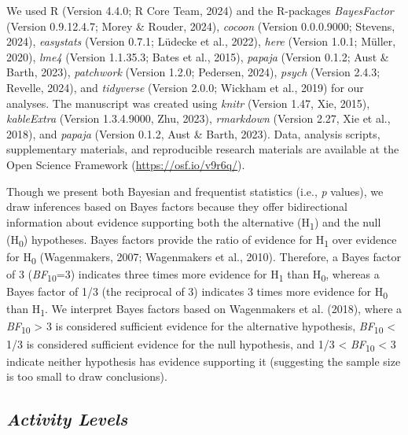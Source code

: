 \documentclass[
  pub]{apa6}
\begin{document}
We used R (Version 4.4.0; R Core Team, 2024) and the R-packages \emph{BayesFactor} (Version 0.9.12.4.7; Morey \& Rouder, 2024), \emph{cocoon} (Version 0.0.0.9000; Stevens, 2024), \emph{easystats} (Version 0.7.1; Lüdecke et al., 2022), \emph{here} (Version 1.0.1; Müller, 2020), \emph{lme4} (Version 1.1.35.3; Bates et al., 2015), \emph{papaja} (Version 0.1.2; Aust \& Barth, 2023), \emph{patchwork} (Version 1.2.0; Pedersen, 2024), \emph{psych} (Version 2.4.3; Revelle, 2024), and \emph{tidyverse} (Version 2.0.0; Wickham et al., 2019) for our analyses. The manuscript was created using \emph{knitr} (Version 1.47, Xie, 2015), \emph{kableExtra} (Version 1.3.4.9000, Zhu, 2023), \emph{rmarkdown} (Version 2.27, Xie et al., 2018), and \emph{papaja} (Version 0.1.2, Aust \& Barth, 2023). Data, analysis scripts, supplementary materials, and reproducible research materials are available at the Open Science Framework (\url{https://osf.io/v9r6q/}).

Though we present both Bayesian and frequentist statistics (i.e., \emph{p} values), we draw inferences based on Bayes factors because they offer bidirectional information about evidence supporting both the alternative (H\textsubscript{1}) and the null (H\textsubscript{0}) hypotheses. Bayes factors provide the ratio of evidence for H\textsubscript{1} over evidence for H\textsubscript{0} (Wagenmakers, 2007; Wagenmakers et al., 2010). Therefore, a Bayes factor of 3 (\emph{BF}\textsubscript{10}=3) indicates three times more evidence for H\textsubscript{1} than H\textsubscript{0}, whereas a Bayes factor of 1/3 (the reciprocal of 3) indicates 3 times more evidence for H\textsubscript{0} than H\textsubscript{1}. We interpret Bayes factors based on Wagenmakers et al. (2018), where a \emph{BF}\textsubscript{10} \textgreater{} 3 is considered sufficient evidence for the alternative hypothesis, \emph{BF}\textsubscript{10} \textless{} 1/3 is considered sufficient evidence for the null hypothesis, and 1/3 \textless{} \emph{BF}\textsubscript{10} \textless{} 3 indicate neither hypothesis has evidence supporting it (suggesting the sample size is too small to draw conclusions).

\subsection{\texorpdfstring{\emph{Activity Levels}}{Activity Levels}}\label{activity-levels-1}
\end{document}
